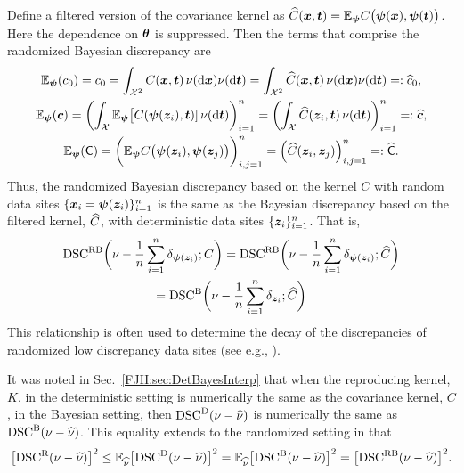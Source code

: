 \documentclass[graybox,footinfo]{svmult}
\begin{document}
Define a filtered version of the covariance kernel as $\widehat{C}({\boldsymbol{x}},{\boldsymbol{t}}) = {\mathbb{E}}_{{\boldsymbol{\psi}}} 
C\bigl({\boldsymbol{\psi}}({\boldsymbol{x}}), {\boldsymbol{\psi}}({\boldsymbol{t}}) \bigr)$.  Here the dependence on ${\boldsymbol{\theta}}$ is 
suppressed.  Then the terms that comprise the randomized 
Bayesian discrepancy are
	\begin{gather*}
	 {\mathbb{E}}_{{\boldsymbol{\psi}}}(c_0)  = c_0 =  \int_{{\mathcal{X}}^2} C({\boldsymbol{x}},{\boldsymbol{t}}) \, \nu(\mathrm{d} {\boldsymbol{x}}) \nu(\mathrm{d} 
	 {\boldsymbol{t}}) = 
	 \int_{{\mathcal{X}}^2} \widehat{C}({\boldsymbol{x}},{\boldsymbol{t}}) \, \nu(\mathrm{d} {\boldsymbol{x}}) \nu(\mathrm{d} {\boldsymbol{t}}) =: \widehat{c}_0, \\
	 {\mathbb{E}}_{{\boldsymbol{\psi}}}({\boldsymbol{c}}) = 
	\biggl( \int_{{\mathcal{X}}} 
	{\mathbb{E}}_{{\boldsymbol{\psi}}}\bigl[C({\boldsymbol{\psi}}({\boldsymbol{z}}_i),{\boldsymbol{t}})] \,\nu(\mathrm{d} {\boldsymbol{t}}) \biggr)_{i=1}^n = 
	\biggl( \int_{{\mathcal{X}}} 
	\widehat{C}({\boldsymbol{z}}_i,{\boldsymbol{t}}) \,\nu(\mathrm{d} {\boldsymbol{t}}) \biggr)_{i=1}^n = : \widehat{{\boldsymbol{c}}}, \\
	 {\mathbb{E}}_{{\boldsymbol{\psi}}}(\mathsf{C})  = \biggl(  {\mathbb{E}}_{{\boldsymbol{\psi}}} 
	 C\bigl({\boldsymbol{\psi}}({\boldsymbol{z}}_i), {\boldsymbol{\psi}}({\boldsymbol{z}}_j) \bigr) \biggr)_{i,j=1}^n = \Bigl( \widehat{C}({\boldsymbol{z}}_i,{\boldsymbol{z}}_j) 
	 \Bigr)_{i,j=1}^n =: \widehat{\mathsf{C}}.
	\end{gather*}
Thus, the randomized Bayesian discrepancy based on the kernel $C$ with random data 
sites $\{{\boldsymbol{x}}_i = {\boldsymbol{\psi}}({\boldsymbol{z}}_i)\}_{i=1}^n$ is the same as the Bayesian discrepancy based 
on the filtered kernel, $\widehat{C}$, with deterministic data sites $\{{\boldsymbol{z}}_i\}_{i=1}^n$.  That is, 
\begin{multline}
\textup{DSC}^{\textup{R}\textup{B}}\biggl(\nu - \frac 1n \sum_{i=1}^n \delta_{{\boldsymbol{\psi}}({\boldsymbol{z}}_i)} ; C\biggr) = 
\textup{DSC}^{\textup{R}\textup{B}}\biggl(\nu - \frac 1n \sum_{i=1}^n \delta_{{\boldsymbol{\psi}}({\boldsymbol{z}}_i)} ; \widehat{C}\biggr) \\
=
\textup{DSC}^{\textup{B}}\biggl(\nu - 
\frac 1n \sum_{i=1}^n \delta_{{\boldsymbol{z}}_i} ; \widehat{C} \biggr)
\end{multline}
This relationship is often used to determine the decay of the discrepancies of 
randomized low 
discrepancy data sites (see e.g., \cite{HicWoz00a, HicYue00}).

It was noted in Sec.\ \ref{FJH:sec:DetBayesInterp} that when the reproducing kernel, 
$K$, in the deterministic setting is numerically the same as the covariance kernel, $C$, 
in the Bayesian setting, then $\textup{DSC}^{\textup{D}}(\nu - \widehat{\nu})$ is numerically the same as 
$\textup{DSC}^{\textup{B}}(\nu - \widehat{\nu})$.  This equality extends to the randomized setting in that 
\begin{equation*}
\bigl[\textup{DSC}^{\textup{R}}(\nu - \widehat{\nu})\bigr]^2 \le {\mathbb{E}}_{\widehat{\nu}} \bigl[\textup{DSC}^{\textup{D}}(\nu - \widehat{\nu})\bigr]^2 = 
{\mathbb{E}}_{\widehat{\nu}} \bigl[\textup{DSC}^{\textup{B}}(\nu - 
\widehat{\nu})\bigr]^2 = \bigl[\textup{DSC}^{\textup{R}\textup{B}}(\nu - \widehat{\nu})\bigr]^2.
\end{equation*}
\end{document}
